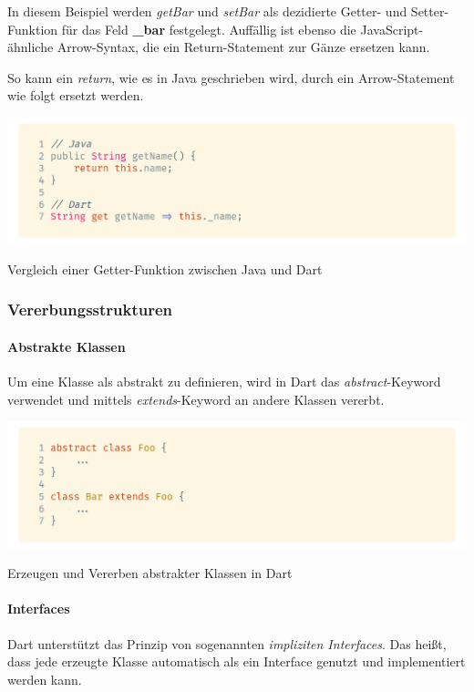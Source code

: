 In diesem Beispiel werden \textit{getBar} und \textit{setBar} als dezidierte Getter- und Setter-Funktion für das Feld \textbf{\_bar} festgelegt. Auffällig ist ebenso die JavaScript-ähnliche Arrow-Syntax, die ein Return-Statement zur Gänze ersetzen kann.

\newpage

So kann ein \textit{return}, wie es in Java geschrieben wird, durch ein Arrow-Statement wie folgt
ersetzt werden.

\begin{code}[H]
    \centering
    \includegraphics[width=1\textwidth]{images/Dart/theory/dartVSJavaGetter.png}
    \vspace{-25pt}
    \caption{Vergleich einer Getter-Funktion zwischen Java und Dart}
\end{code}

\subsubsection{Vererbungsstrukturen}

\paragraph{Abstrakte Klassen}


Um eine Klasse als abstrakt zu definieren, wird in Dart das \textit{abstract}-Keyword verwendet und mittels
\textit{extends}-Keyword an andere Klassen vererbt.

\begin{code}[H]
    \centering
    \includegraphics[width=1\textwidth]{images/Dart/theory/dartAbstractClass.png}
    \vspace{-25pt}
    \caption{Erzeugen und Vererben abstrakter Klassen in Dart}
\end{code}

\paragraph{Interfaces}
 

Dart unterstützt das Prinzip von sogenannten \textit{impliziten Interfaces}. Das heißt, dass jede erzeugte Klasse automatisch als ein Interface genutzt und implementiert werden kann.
